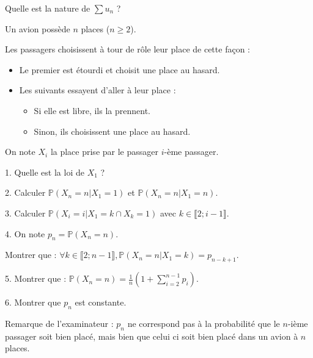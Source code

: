 \vspace{5pt}
\noindent Quelle est la nature de $\sum u_n$ ?



\subetoiles



\noindent Un avion possède $n$ places ($n \geqslant 2$).

\noindent Les passagers choisissent à tour de rôle leur place de cette façon :
\begin{itemize}
  \item Le premier est étourdi et choisit une place au hasard.
  \item Les suivants essayent d'aller à leur place :
  \begin{itemize}
    \item Si elle est libre, ils la prennent.
    \item Sinon, ils choisissent une place au hasard.
  \end{itemize}
\end{itemize}

\noindent On note $X_i$ la place prise par le passager $i$-ème passager.

\vspace{5pt}
1. Quelle est la loi de $X_1$ ?

\vspace{5pt}
2. Calculer $\mathbb{P}(X_n = n | X_1 = 1)$ et $\mathbb{P}(X_n = n | X_1 = n)$.

\vspace{5pt}
3. Calculer $\mathbb{P}(X_i = i | X_1 = k \cap X_k = 1)$ avec $k \in \llbracket 2; i-1 \rrbracket$.

\vspace{5pt}
4. On note $p_n = \mathbb{P}(X_n = n)$.

Montrer que : $\forall k \in \llbracket 2; n-1 \rrbracket, \mathbb{P}(X_n = n | X_1 = k) = p_{n-k+1}$.

\vspace{5pt}
5. Montrer que : $\displaystyle \mathbb{P}(X_n = n) = \frac {1} {n} \left(1+ \sum_{i=2}^{n-1}p_i\right)$.

\vspace{5pt}
6. Montrer que $p_n$ est constante.

\vspace{5pt}
Remarque de l'examinateur : $p_n$ ne correspond pas à la probabilité que le $n$-ième passager soit bien placé,
mais bien que celui ci soit bien placé dans un avion à $n$ places.



